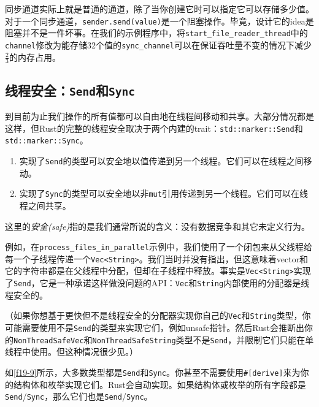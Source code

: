 同步通道实际上就是普通的通道，除了当你创建它时可以指定它可以存储多少值。对于一个同步通道，\texttt{sender.send(value)}是一个阻塞操作。毕竟，设计它的idea是阻塞并不是一件坏事。在我们的示例程序中，将\texttt{start\_file\_reader\_thread}中的\texttt{channel}修改为能存储32个值的\texttt{sync\_channel}可以在保证吞吐量不变的情况下减少$\frac{2}{3}$的内存占用。

\subsection{线程安全：\texttt{Send}和\texttt{Sync}}\label{threadsafe}
到目前为止我们操作的所有值都可以自由地在线程间移动和共享。大部分情况都是这样，但Rust的完整的线程安全取决于两个内建的trait：\texttt{std::marker::Send}和\texttt{std::marker::Sync}。

\begin{enumerate}
    \item 实现了\texttt{Send}的类型可以安全地以值传递到另一个线程。它们可以在线程之间移动。
    \item 实现了\texttt{Sync}的类型可以安全地以非\texttt{mut}引用传递到另一个线程。它们可以在线程之间共享。
\end{enumerate}

这里的\emph{安全(safe)}指的是我们通常所说的含义：没有数据竞争和其它未定义行为。

例如，在\texttt{process\_files\_in\_parallel}示例中，我们使用了一个闭包来从父线程给每一个子线程传递一个\texttt{Vec<String>}。我们当时并没有指出，但这意味着vector和它的字符串都是在父线程中分配，但却在子线程中释放。事实是\texttt{Vec<String>}实现了\texttt{Send}，它是一种承诺这样做没问题的API：\texttt{Vec}和\texttt{String}内部使用的分配器是线程安全的。

（如果你想基于更快但不是线程安全的分配器实现你自己的\texttt{Vec}和\texttt{String}类型，你可能需要使用不是\texttt{Send}的类型来实现它们，例如unsafe指针。然后Rust会推断出你的\texttt{NonThreadSafeVec}和\texttt{NonThreadSafeString}类型不是\texttt{Send}，并限制它们只能在单线程中使用。但这种情况很少见。）

如\autoref{f19-9}所示，大多数类型都是\texttt{Send}和\texttt{Sync}。你甚至不需要使用\texttt{\#[derive]}来为你的结构体和枚举实现它们。Rust会自动实现。如果结构体或枚举的所有字段都是\texttt{Send}/\texttt{Sync}，那么它们也是\texttt{Send}/\texttt{Sync}。

